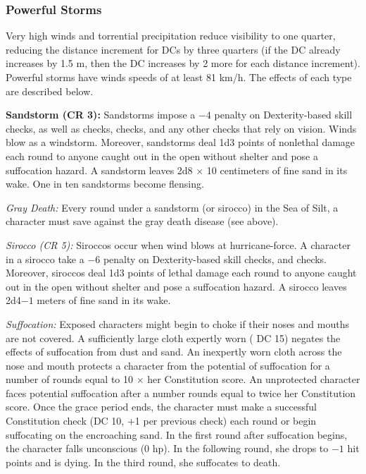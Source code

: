 \subsubsection{Powerful Storms}
Very high winds and torrential precipitation reduce visibility to one quarter, reducing the distance increment for  DCs by three quarters (if the DC already increases by 1.5 m, then the DC increases by 2 more for each distance increment). Powerful storms have winds speeds of at least 81 km/h. The effects of each type are described below.


\textbf{Sandstorm (CR 3):} Sandstorms impose a $-4$ penalty on Dexterity-based skill checks, as well as  checks,  checks, and any other checks that rely on vision. Winds blow as a windstorm. Moreover, sandstorms deal 1d3 points of nonlethal damage each round to anyone caught out in the open without shelter and pose a suffocation hazard. A sandstorm leaves 2d8 $\times$ 10 centimeters of fine sand in its wake. One in ten sandstorms become flensing.

\textit{Gray Death:} Every round under a sandstorm (or sirocco) in the Sea of Silt, a character must save against the gray death disease (see above).

\textit{Sirocco (CR 5):} Siroccos occur when wind blows at hurricane-force. A character in a sirocco take a $-6$ penalty on Dexterity-based skill checks, and  checks. Moreover, siroccos deal 1d3 points of lethal damage each round to anyone caught out in the open without shelter and pose a suffocation hazard. A sirocco leaves 2d4$-1$ meters of fine sand in its wake.

\textit{Suffocation:} Exposed characters might begin to choke if their noses and mouths are not covered. A sufficiently large cloth expertly worn ( DC 15) negates the effects of suffocation from dust and sand. An inexpertly worn cloth across the nose and mouth protects a character from the potential of suffocation for a number of rounds equal to 10 $\times$ her Constitution score. An unprotected character faces potential suffocation after a number rounds equal to twice her Constitution score. Once the grace period ends, the character must make a successful Constitution check (DC 10, +1 per previous check) each round or begin suffocating on the encroaching sand. In the first round after suffocation begins, the character falls unconscious (0 hp). In the following round, she drops to $-1$ hit points and is dying. In the third round, she suffocates to death.

